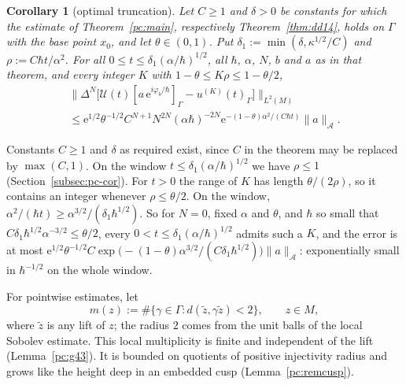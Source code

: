 \documentclass[twoside,10pt]{article}
\numberwithin{equation}{section}
\theoremstyle{slbody}
\newtheorem{corollary}[equation]{Corollary}
\theoremstyle{remark}
\newcommand{\norm}[1]{\lVert #1\rVert}
\newcommand{\ue}{\mathrm{e}}
\newcommand{\cU}{\mathcal{U}}
\begin{document}
\begin{corollary}[optimal truncation]\label{pc:cor15}\label{cor:dd15}
Let $C\ge1$ and $\delta>0$ be constants for which the estimate of Theorem~\ref{pc:main}, respectively Theorem~\ref{thm:dd14}, holds
on $\Gamma$ with the base point $x_0$, and let $\theta\in(0,1)$. Put $\delta_1:=\min(\delta,\kappa^{1/2}/C)$ and $\rho:=C\hbar t/\alpha^2$.
For all $0\le t\le\delta_1(\alpha/\hbar)^{1/2}$, all $\hbar$, $\alpha$, $N$, $b$ and $a$ as in that theorem, and every integer $K$
with $1-\theta\le K\rho\le1-\theta/2$,
\begin{multline*}
  \norm{\Delta^N\big[\cU(t)[a\,\ue^{i\varphi_b/\hbar}]_\Gamma-u^{(K)}(t)_\Gamma\big]}_{L^2(M)}\\
    \le\ue^{1/2}\theta^{-1/2}C^{N+1}N^{2N}(\alpha\hbar)^{-2N}\ue^{-(1-\theta)\alpha^2/(C\hbar t)}\norm a_{\mathcal A}.
\end{multline*}
\end{corollary}

Constants $C\ge1$ and $\delta$ as required exist, since $C$ in the theorem may be replaced by $\max(C,1)$. On the window
$t\le\delta_1(\alpha/\hbar)^{1/2}$ we have $\rho\le1$ (Section~\ref{subsec:pc-cor}). For $t>0$ the range of $K$ has length
$\theta/(2\rho)$, so it contains an integer whenever $\rho\le\theta/2$. On the window,
$\alpha^2/(\hbar t)\ge\alpha^{3/2}/(\delta_1\hbar^{1/2})$. So for $N=0$, fixed $\alpha$ and $\theta$, and $\hbar$ so small that
$C\delta_1\hbar^{1/2}\alpha^{-3/2}\le\theta/2$, every $0<t\le\delta_1(\alpha/\hbar)^{1/2}$ admits such a $K$, and the error is at most
$\ue^{1/2}\theta^{-1/2}C\exp\bigl(-(1-\theta)\alpha^{3/2}/(C\delta_1\hbar^{1/2})\bigr)\norm a_{\mathcal A}$: exponentially small in
$\hbar^{-1/2}$ on the whole window.



For pointwise estimates, let
\[
  m(z):=\#\{\gamma\in\Gamma:d(\tilde z,\gamma\tilde z)<2\},\qquad z\in M,
\]
where $\tilde z$ is any lift of $z$; the radius $2$ comes from the unit balls of the local Sobolev estimate. This local
multiplicity is finite and independent of the lift (Lemma~\ref{pc:g43}).
It is bounded on quotients of positive injectivity radius and grows like the height deep in an embedded cusp
(Lemma~\ref{pc:remcusp}).
\end{document}
